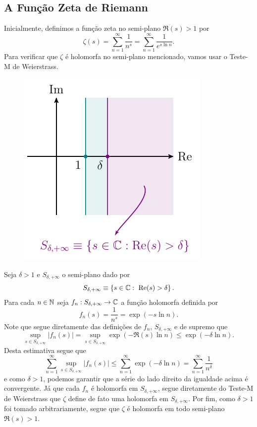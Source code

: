     \subsection{A Função Zeta de Riemann}
    \begin{center}
    \end{center}
    Inicialmente, definimos a função zeta no semi-plano $\Re(s) > 1$
    por
    \[
    \zeta(s) = \sum_{n=1}^{\infty} \frac{1}{n^s} 
             = \sum_{n=1}^{\infty} \frac{1}{e^{s\ln n}}.
    \]
    Para verificar que $\zeta$ é holomorfa no semi-plano mencionado,
    vamos usar o Teste-M de Weierstrass.
    \begin{figure}[H]\centering
        \includegraphics{Figuras/S delta infinito.pdf}
    \end{figure}
    Seja $\delta>1$ e $S_{\delta, +\infty}$  
    o semi-plano dado por
    \[
    S_{\delta, +\infty} 
    \equiv 
    \left\{ s\in\mathbb{C} :\ \mathrm{Re}(s) > \delta \right\}.
    \]
    Para cada $n\in\mathbb{N}$ seja  
    $f_n: S_{\delta, +\infty}\to\mathbb{C}$
    a função holomorfa definida por
    \[
    f_n(s) = \frac{1}{n^s} = \exp(-s\ln n).
    \]
    Note que segue diretamente das definições 
    de $f_n$, $S_{\delta, +\infty}$ e de supremo que
    \[
    \sup_{s\in S_{\delta,+\infty}} |f_n(s)| 
    = 
    \sup_{s\in S_{\delta,+\infty}}
    \exp(-\Re(s)\ln n) 
    \leq 
    \exp(-\delta\ln n).
    \]
    Desta estimativa segue que 
    \[
    \sum_{n=1}^{\infty} 
    \sup_{s\in S_{\delta,+\infty}}|f_n(s)|
    \leq 
    \sum_{n=1}^{\infty} \exp(-\delta\ln n)
    = 
    \sum_{n=1}^{\infty} \frac{1}{n^\delta}
    \]
    e como $\delta > 1$, podemos garantir que 
    a série do lado direito da igualdade acima é convergente.
    Já que cada $f_n$ é holomorfa em $S_{\delta, +\infty}$, segue
    diretamente do Teste-M de Weierstrass que $\zeta$ define de fato uma holomorfa em
    $S_{\delta,+\infty}$. 
    Por fim,
    como $\delta > 1$ foi tomado arbitrariamente, segue que
    $\zeta$ é holomorfa em todo semi-plano $\Re(s) > 1$.
    
